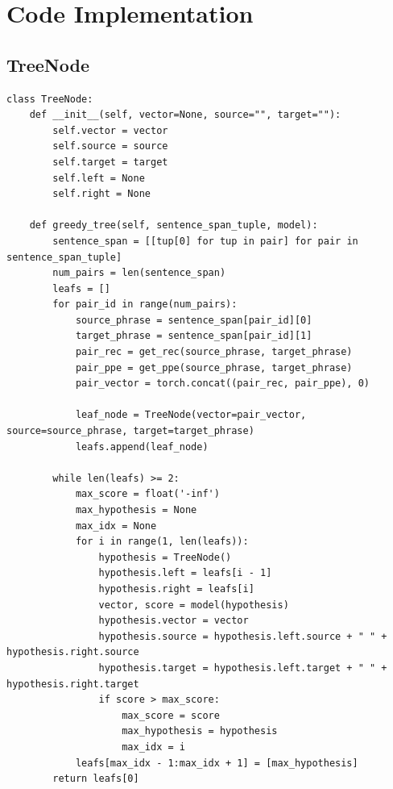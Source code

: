 \documentclass[12pt,a4paper,twoside,openright]{report}
\begin{document}


\appendix

\chapter{Code Implementation}\label{appendix:code}

\section{TreeNode}
\begin{lstlisting}
class TreeNode:
    def __init__(self, vector=None, source="", target=""):
        self.vector = vector
        self.source = source
        self.target = target
        self.left = None
        self.right = None

    def greedy_tree(self, sentence_span_tuple, model):
        sentence_span = [[tup[0] for tup in pair] for pair in sentence_span_tuple]
        num_pairs = len(sentence_span)
        leafs = []
        for pair_id in range(num_pairs):
            source_phrase = sentence_span[pair_id][0]
            target_phrase = sentence_span[pair_id][1]
            pair_rec = get_rec(source_phrase, target_phrase)
            pair_ppe = get_ppe(source_phrase, target_phrase)
            pair_vector = torch.concat((pair_rec, pair_ppe), 0)

            leaf_node = TreeNode(vector=pair_vector, source=source_phrase, target=target_phrase)
            leafs.append(leaf_node)

        while len(leafs) >= 2:
            max_score = float('-inf')
            max_hypothesis = None
            max_idx = None
            for i in range(1, len(leafs)):
                hypothesis = TreeNode()
                hypothesis.left = leafs[i - 1]
                hypothesis.right = leafs[i]
                vector, score = model(hypothesis)
                hypothesis.vector = vector
                hypothesis.source = hypothesis.left.source + " " + hypothesis.right.source
                hypothesis.target = hypothesis.left.target + " " + hypothesis.right.target
                if score > max_score:
                    max_score = score
                    max_hypothesis = hypothesis
                    max_idx = i
            leafs[max_idx - 1:max_idx + 1] = [max_hypothesis]
        return leafs[0]
\end{lstlisting}
\end{document}
